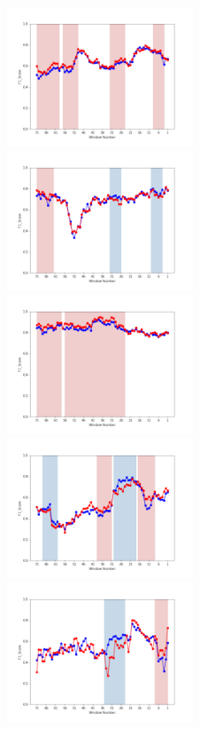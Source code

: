 \documentclass[11pt]{jreport}
\begin{document}
\begin{figure}[H]
\begin{center}
    \includegraphics[width=0.495\textwidth]{Uenaka_fig/RQ2_result/Nova_review_F1.pdf}
    \includegraphics[width=0.495\textwidth]{Uenaka_fig/RQ2_result/Neutron_review_F1.pdf}
    \includegraphics[width=0.495\textwidth]{Uenaka_fig/RQ2_result/Cinder_review_F1.pdf}
    \includegraphics[width=0.495\textwidth]{Uenaka_fig/RQ2_result/Keystone_review_F1.pdf}
    \includegraphics[width=0.495\textwidth]{Uenaka_fig/RQ2_result/Swift_review_F1.pdf}

\end{center}
\end{figure}
\end{document}

